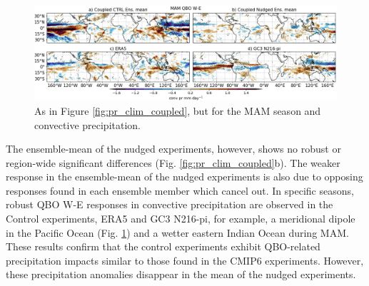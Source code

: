 \begin{figure}[t!]
\centering
 \includegraphics[width=\linewidth]{figures/conv_prseasonal_mamqbowqboe.png}
\caption[SST response in DJF to the QBO in coupled nudged experiments]{ As in Figure \ref{fig:pr_clim_coupled}, but for the MAM season and convective precipitation.}
\label{fig:pr_mam_coupled}
\end{figure}

The ensemble-mean of the nudged experiments, however, shows no robust or region-wide significant differences (Fig. \ref{fig:pr_clim_coupled}b). The weaker response in the ensemble-mean of the nudged experiments is also due to opposing responses found in each ensemble member which cancel out. In specific seasons, robust QBO W-E responses in convective precipitation are observed in the Control experiments, ERA5 and GC3 N216-pi, for example, a meridional dipole in the Pacific Ocean (Fig. \ref{fig:pr_mam_coupled}) and a wetter eastern Indian Ocean during MAM. These results confirm that the control experiments exhibit QBO-related precipitation impacts similar to those found in the CMIP6 experiments. However, these precipitation anomalies disappear in the mean  of the nudged experiments. 


